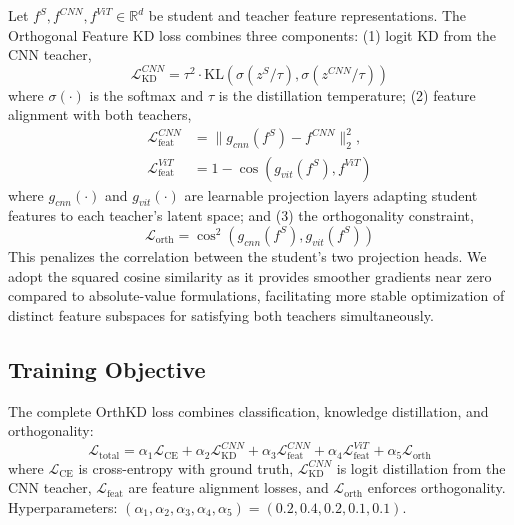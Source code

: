 \documentclass{article}
\begin{document}
Let $f^S, f^{CNN}, f^{ViT} \in \mathbb{R}^d$ be student and teacher feature representations. The Orthogonal Feature KD loss combines three components: (1) logit KD from the CNN teacher,
\begin{equation}
\mathcal{L}_{\mathrm{KD}}^{CNN} = \tau^2 \cdot \mathrm{KL}\left(\sigma(z^S/\tau), \sigma(z^{CNN}/\tau)\right)
\end{equation}
where $\sigma(\cdot)$ is the softmax and $\tau$ is the distillation temperature; (2) feature alignment with both teachers,
\begin{equation}
\begin{aligned}
\mathcal{L}_{\text{feat}}^{CNN} &= \|g_{cnn}(f^S) - f^{CNN}\|_2^2, \\
\mathcal{L}_{\text{feat}}^{ViT} &= 1 - \cos(g_{vit}(f^S), f^{ViT})
\end{aligned}
\end{equation}
where $g_{cnn}(\cdot)$ and $g_{vit}(\cdot)$ are learnable projection layers adapting student features to each teacher's latent space; and (3) the orthogonality constraint,
\begin{equation}
\mathcal{L}_{\text{orth}} = \cos^2(g_{cnn}(f^S), g_{vit}(f^S))
\label{eq:orth}
\end{equation}
 This penalizes the correlation between the student's two projection heads. We adopt the squared cosine similarity as it provides smoother gradients near zero compared to absolute-value formulations, facilitating more stable optimization of distinct feature subspaces for satisfying both teachers simultaneously.

\subsection{Training Objective}
The complete OrthKD loss combines classification, knowledge distillation, and orthogonality:
\begin{equation}
\mathcal{L}_{\mathrm{total}} = \alpha_1 \mathcal{L}_{\mathrm{CE}} + \alpha_2 \mathcal{L}_{\mathrm{KD}}^{CNN} + \alpha_3 \mathcal{L}_{\text{feat}}^{CNN} + \alpha_4 \mathcal{L}_{\text{feat}}^{ViT} + \alpha_5 \mathcal{L}_{\text{orth}}
\end{equation}
where $\mathcal{L}_{\mathrm{CE}}$ is cross-entropy with ground truth, $\mathcal{L}_{\mathrm{KD}}^{CNN}$ is logit distillation from the CNN teacher, $\mathcal{L}_{\text{feat}}$ are feature alignment losses, and $\mathcal{L}_{\text{orth}}$ enforces orthogonality. Hyperparameters: $(\alpha_1, \alpha_2, \alpha_3, \alpha_4, \alpha_5) = (0.2, 0.4, 0.2, 0.1, 0.1)$.
\end{document}
